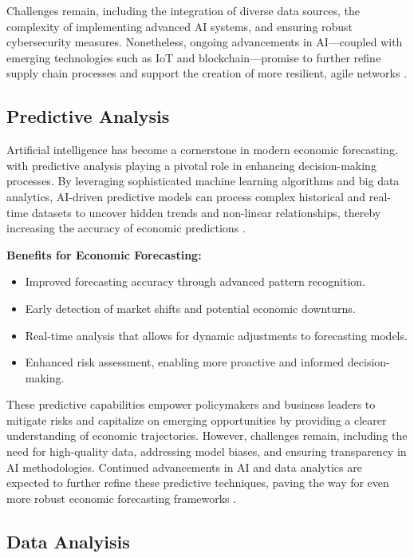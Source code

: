 Challenges remain, including the integration of diverse data sources, 
the complexity of implementing advanced AI systems, and ensuring robust cybersecurity measures. Nonetheless, ongoing advancements 
in AI—coupled with emerging technologies such as IoT and blockchain—promise to further refine supply chain processes and support the creation of more resilient, 
agile networks \cite{IBM-AI-Supply-Chain}.

\subsection{Predictive Analysis}

Artificial intelligence has become a cornerstone in modern economic forecasting, with predictive analysis playing a pivotal role in enhancing decision-making processes. By leveraging sophisticated machine learning algorithms and big data analytics, AI-driven predictive models can process complex historical and real-time datasets to uncover hidden trends and non-linear relationships, thereby increasing the accuracy of economic predictions \cite{Predictive-Analysis-ai}.

\textbf{Benefits for Economic Forecasting:}
\begin{itemize}
    \item Improved forecasting accuracy through advanced pattern recognition.
    \item Early detection of market shifts and potential economic downturns.
    \item Real-time analysis that allows for dynamic adjustments to forecasting models.
    \item Enhanced risk assessment, enabling more proactive and informed decision-making.
\end{itemize}

These predictive capabilities empower policymakers and business leaders to mitigate risks and capitalize on emerging opportunities by providing a clearer understanding of economic trajectories. However, challenges remain, including the need for high-quality data, addressing model biases, and ensuring transparency in AI methodologies. Continued advancements in AI and data analytics are expected to further refine these predictive techniques, paving the way for even more robust economic forecasting frameworks \cite{Predictive-Analysis-ai}.

\subsection{Data Analyisis}
\label{subsec:data-analysis}

